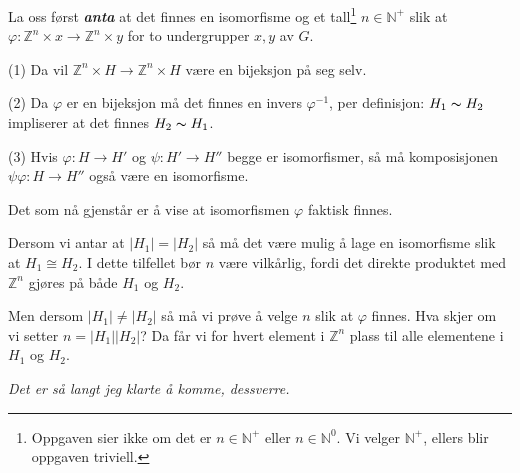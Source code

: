 \documentclass[a4paper,norsk,twocolumn,10pt]{article}
\begin{document}
La oss først \textbf{\textit{anta}} at det finnes en isomorfisme og et
tall\footnote{Oppgaven sier ikke om det er $n \in \mathbb{N}^+$ eller $n \in
\mathbb{N}^0$. Vi velger $\mathbb{N}^+$, ellers blir oppgaven triviell.} $n \in
\mathbb{N}^+$ slik at $\varphi\colon \mathbb{Z}^n \times x \rightarrow
\mathbb{Z}^n \times y$ for to undergrupper $x,y$ av $G$.

(1) Da vil $\mathbb{Z}^n \times H \rightarrow \mathbb{Z}^n \times H$ være en
bijeksjon på seg selv.

(2) Da $\varphi$ er en bijeksjon må det finnes en invers $\varphi^{-1}$, per
definisjon: $H_1 \thicksim H_2$ impliserer at det finnes $H_2 \thicksim H_1$.

(3) Hvis $\varphi\colon H \rightarrow H'$ og $\psi\colon H' \rightarrow H''$ begge
er isomorfismer, så må komposisjonen $\psi\varphi\colon H \rightarrow H''$ også
være en isomorfisme.

Det som nå gjenstår er å vise at isomorfismen $\varphi$ faktisk finnes.

Dersom vi antar at $|H_1| = |H_2|$ så må det være mulig å lage en isomorfisme
slik at $H_1 \cong H_2$. I dette tilfellet bør $n$ være vilkårlig, fordi det
direkte produktet med $\mathbb{Z}^n$ gjøres på både $H_1$ og $H_2$.

Men dersom $|H_1| \ne |H_2|$ så må vi prøve å velge $n$ slik at $\varphi$
finnes. Hva skjer om vi setter $n = |H_1| |H_2|$? Da får vi for hvert element i
$\mathbb{Z}^n$ plass til alle elementene i $H_1$ og $H_2$.

\textit{Det er så langt jeg klarte å komme, dessverre.}
\end{document}

